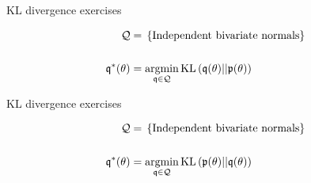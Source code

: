 \begin{frame}{KL divergence exercises}
\begin{minipage}{0.5\textwidth}
\begin{align*}
%
\qdom ={}& \left\{ \textrm{Independent bivariate normals}\right\}\\
\\
\qopt(\theta) ={}& \argmin{\q \in \qdom} \kl{\q(\theta)}{\p(\theta)}
%
\end{align*}
%
\end{minipage}
%
\begin{minipage}{0.4\textwidth}

\end{minipage}

\end{frame}





\begin{frame}{KL divergence exercises}
\begin{minipage}{0.5\textwidth}
\begin{align*}
%
\qdom ={}& \left\{ \textrm{Independent bivariate normals}\right\}\\
\\
\qopt(\theta) ={}& \argmin{\q \in \qdom} \kl{\p(\theta)}{\q(\theta)}
%
\end{align*}
%
\end{minipage}
%
\begin{minipage}{0.4\textwidth}

\end{minipage}

\end{frame}




